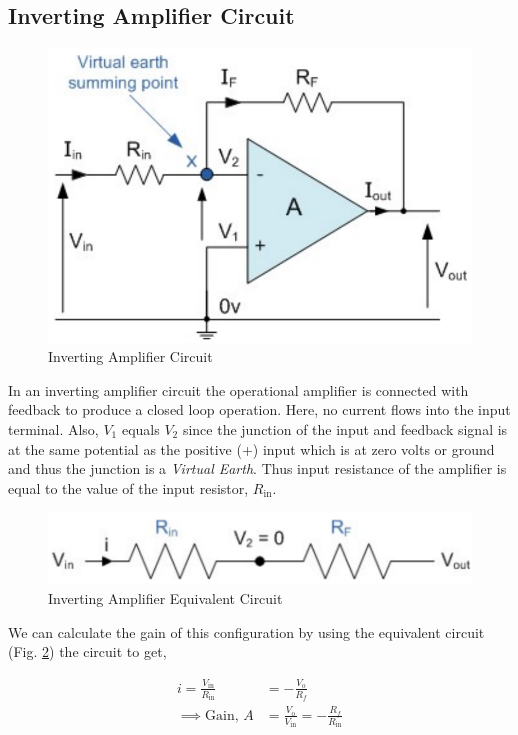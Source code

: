 \subsection{Inverting Amplifier Circuit}

\begin{figure}[H]
    \centering
    \includegraphics[width=0.7\columnwidth]{images/inv1.png}
    \caption{Inverting Amplifier Circuit}
    \label{inv1}
\end{figure}

In an inverting amplifier circuit the operational amplifier is connected with feedback to produce a closed loop operation. Here, no current flows into the input terminal. Also, $V_1$ equals $V_2$ since the junction of the input and feedback signal is at the same potential as the positive (+) input which is at zero volts or ground and thus the junction is a \textit{Virtual Earth}. Thus input resistance of the amplifier is equal to the value of the input resistor, $R_\text{in}$.

\begin{figure}[H]
    \centering
    \includegraphics[width=0.8\columnwidth]{images/inv2.png}
    \caption{Inverting Amplifier Equivalent Circuit}
    \label{inv2}
\end{figure}

We can calculate the gain of this configuration by using the equivalent circuit (Fig. \ref{inv2}) the circuit to get,

\begin{align}
    i = \frac{V_\text{in}}{R_\text{in}} &= -\frac{V_\text{o}}{R_f} \nonumber \\
    \implies \text{Gain, } A &= \frac{V_\text{o}}{V_\text{in}} = -\frac{R_f}{R_\text{in}} \label{inv gain}
\end{align}

